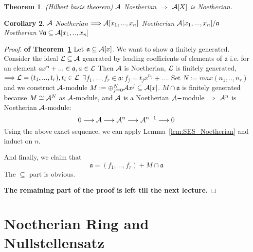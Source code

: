 \documentclass[11pt]{article}
\newtheorem{thm}{Theorem}[section]
\newtheorem{cor}[thm]{Corollary}
\newcommand{\sca}{{\mathfrak a}}
\newcommand{\cala}{{\cal A}}
\newcommand{\call}{{\cal L}}
\newcommand{\Lrta}{\Longrightarrow}
\newcommand{\lrta}{\longrightarrow}
\begin{document}
\begin{thm}\label{thm:Hilbert_Basis}(Hilbert basis theorem)
$\cala$ Noetherian $\Lrta $ $\cala[X]$ is Noetherian.
\end{thm}

\begin{cor}\label{cor:Noetherian_quotient_module}
$\cala$ Noetherian $\Lrta \cala[x_1,...,x_n]$ Noetherian $\cala[x_1,...,x_n]/\sca$ Noetherian $\forall \sca\subseteq \cala[x_1,..,x_n]$
\end{cor}

\begin{proof}\textbf{of Theorem~\ref{thm:Hilbert_Basis}}
Let $\sca\subseteq \cala[x]$. We want to show $\sca$ finitely generated. Consider the ideal $\call\subseteq \cala$ generated by leading coefficients of elements of $\sca$ i.e. for an element $ax^n+...\in\sca,a\in\call$
Then $\cala$ is  Noetherian, $\call$ is finitely generated, $\Lrta\call=(t_1,...,t_r),t_i\in \call$ $\exists f_1,...,f_r\in \sca: f_j=t_j x^{n_j}+...$. Set $N:=max(n_1,..,n_r)$ and we construct $\cala$-module $M:=\oplus^N_{j=0}\cala x^j\subseteq \cala[x]$. $M\cap \sca$ is finitely generated because $M\cong \cala^N$ as $\cala$-module, and $\cala$ is a Noetherian $\cala-$module $\Lrta$ $\cala^n$ is Noetherian $\cala$-module:
$$
0\lrta \cala\lrta \cala^n\lrta \cala^{n-1}\lrta 0
$$
Using the above exact sequence, we can apply Lemma~\ref{lem:SES_Noetherian} and induct on $n$.

And finally, we claim that
$$
\sca=(f_1,...,f_r)+M\cap\sca
$$
The $\subseteq$ part is obvious.

\textbf{The remaining part of the proof is left till the next lecture.}
\end{proof}

\section{Noetherian Ring and Nullstellensatz}
\end{document}
